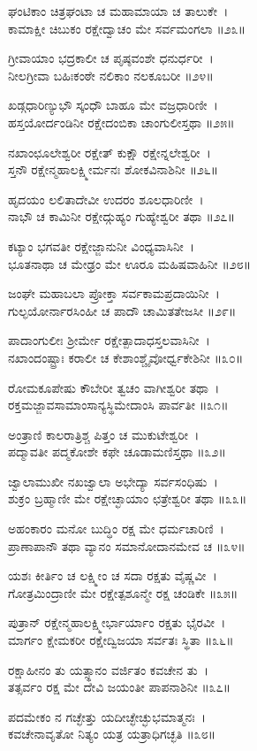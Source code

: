 ಘಂಟಿಕಾಂ ಚಿತ್ರಘಂಟಾ ಚ ಮಹಾಮಾಯಾ ಚ ತಾಲುಕೇ~।\\
ಕಾಮಾಕ್ಷೀ ಚಿಬುಕಂ ರಕ್ಷೇದ್ವಾಚಂ ಮೇ ಸರ್ವಮಂಗಲಾ ॥೨೩॥

ಗ್ರೀವಾಯಾಂ ಭದ್ರಕಾಲೀ ಚ ಪೃಷ್ಠವಂಶೇ ಧನುರ್ಧರೀ~।\\
ನೀಲಗ್ರೀವಾ ಬಹಿಃಕಂಠೇ ನಲಿಕಾಂ ನಲಕೂಬರೀ ॥೨೪॥

ಖಡ್ಗಧಾರಿಣ್ಯುಭೌ ಸ್ಕಂಧೌ ಬಾಹೂ ಮೇ ವಜ್ರಧಾರಿಣೀ~।\\
ಹಸ್ತಯೋರ್ದಂಡಿನೀ ರಕ್ಷೇದಂಬಿಕಾ ಚಾಂಗುಲೀಸ್ತಥಾ ॥೨೫॥

ನಖಾಂಛೂಲೇಶ್ವರೀ ರಕ್ಷೇತ್ ಕುಕ್ಷೌ ರಕ್ಷೇನ್ನಲೇಶ್ವರೀ~।\\
ಸ್ತನೌ ರಕ್ಷೇನ್ಮಹಾಲಕ್ಷ್ಮೀರ್ಮನಃ ಶೋಕವಿನಾಶಿನೀ ॥೨೬॥

ಹೃದಯಂ ಲಲಿತಾದೇವೀ ಉದರಂ ಶೂಲಧಾರಿಣೀ~।\\
ನಾಭೌ ಚ ಕಾಮಿನೀ ರಕ್ಷೇದ್ಗುಹ್ಯಂ ಗುಹ್ಯೇಶ್ವರೀ ತಥಾ ॥೨೭॥

ಕಟ್ಯಾಂ ಭಗವತೀ ರಕ್ಷೇಜ್ಜಾನುನೀ ವಿಂಧ್ಯವಾಸಿನೀ~।\\
ಭೂತನಾಥಾ ಚ ಮೇಢ್ರಂ ಮೇ ಊರೂ ಮಹಿಷವಾಹಿನೀ ॥೨೮॥

ಜಂಘೇ ಮಹಾಬಲಾ ಪ್ರೋಕ್ತಾ ಸರ್ವಕಾಮಪ್ರದಾಯಿನೀ~।\\
ಗುಲ್ಫಯೋರ್ನಾರಸಿಂಹೀ ಚ ಪಾದೌ ಚಾಮಿತತೇಜಸೀ ॥೨೯॥

ಪಾದಾಂಗುಲೀಃ ಶ್ರೀರ್ಮೇ ರಕ್ಷೇತ್ಪಾದಾಧಸ್ತಲವಾಸಿನೀ~।\\
ನಖಾಂದಂಷ್ಟ್ರಾಃ ಕರಾಲೀ ಚ ಕೇಶಾಂಶ್ಚೈವೋರ್ಧ್ವಕೇಶಿನೀ ॥೩೦॥

ರೋಮಕೂಪೇಷು ಕೌಬೇರೀ ತ್ವಚಂ ವಾಗೀಶ್ವರೀ ತಥಾ~।\\
ರಕ್ತಮಜ್ಜಾವಸಾಮಾಂಸಾನ್ಯಸ್ಥಿಮೇದಾಂಸಿ ಪಾರ್ವತೀ ॥೩೧॥

ಅಂತ್ರಾಣಿ ಕಾಲರಾತ್ರಿಶ್ಚ ಪಿತ್ತಂ ಚ ಮುಕುಟೇಶ್ವರೀ~।\\
ಪದ್ಮಾವತೀ ಪದ್ಮಕೋಶೇ ಕಫೇ ಚೂಡಾಮಣಿಸ್ತಥಾ ॥೩೨॥

ಜ್ವಾಲಾಮುಖೀ ನಖಜ್ವಾಲಾ ಅಭೇದ್ಯಾ ಸರ್ವಸಂಧಿಷು~।\\
ಶುಕ್ರಂ ಬ್ರಹ್ಮಾಣೀ ಮೇ ರಕ್ಷೇಚ್ಛಾಯಾಂ ಛತ್ರೇಶ್ವರೀ ತಥಾ ॥೩೩॥

ಅಹಂಕಾರಂ ಮನೋ ಬುದ್ಧಿಂ ರಕ್ಷ ಮೇ ಧರ್ಮಚಾರಿಣಿ~।\\
ಪ್ರಾಣಾಪಾನೌ ತಥಾ ವ್ಯಾನಂ ಸಮಾನೋದಾನಮೇವ ಚ ॥೩೪॥

ಯಶಃ ಕೀರ್ತಿಂ ಚ ಲಕ್ಷ್ಮೀಂ ಚ ಸದಾ ರಕ್ಷತು ವೈಷ್ಣವೀ~।\\
ಗೋತ್ರಮಿಂದ್ರಾಣೀ ಮೇ ರಕ್ಷೇತ್ಪಶೂನ್ಮೇ ರಕ್ಷ ಚಂಡಿಕೇ ॥೩೫॥

ಪುತ್ರಾನ್ ರಕ್ಷೇನ್ಮಹಾಲಕ್ಷ್ಮೀರ್ಭಾರ್ಯಾಂ ರಕ್ಷತು ಭೈರವೀ~।\\
ಮಾರ್ಗಂ ಕ್ಷೇಮಕರೀ ರಕ್ಷೇದ್ವಿಜಯಾ ಸರ್ವತಃ ಸ್ಥಿತಾ ॥೩೬॥

ರಕ್ಷಾಹೀನಂ ತು ಯತ್ಸ್ಥಾನಂ ವರ್ಜಿತಂ ಕವಚೇನ ತು~।\\
ತತ್ಸರ್ವಂ ರಕ್ಷ ಮೇ ದೇವಿ ಜಯಂತೀ ಪಾಪನಾಶಿನೀ ॥೩೭॥

ಪದಮೇಕಂ ನ ಗಚ್ಛೇತ್ತು ಯದೀಚ್ಛೇಚ್ಛುಭಮಾತ್ಮನಃ~।\\
ಕವಚೇನಾವೃತೋ ನಿತ್ಯಂ ಯತ್ರ ಯತ್ರಾಧಿಗಚ್ಛತಿ ॥೩೮॥

